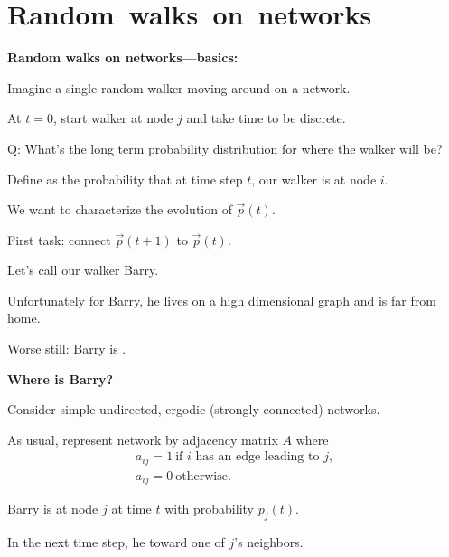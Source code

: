\section{Random\ walks\ on\ networks}

  \textbf{Random walks on networks---basics:}

  
  
    Imagine a single random walker moving
    around on a network.
   
    At $t=0$, start walker at node $j$ and 
    take time to be discrete.
   
    \alert{Q:} What's the long term probability distribution
    for where the walker will be?
   

    Define  as the probability
    that at time step $t$, our walker is at node $i$.
   
    We want to characterize the evolution
    of $\vec{p}(t)$.
   
    First task: connect $\vec{p}(t+1)$ to $\vec{p}(t)$.
   
    {Let's call our walker \alert{Barry}.}
   
    {Unfortunately for Barry,
      he lives on a high dimensional graph and is far from home.}
  
    {Worse still: Barry is .}
  


  \textbf{Where is Barry?}

  
  
    Consider simple undirected, ergodic (strongly connected) networks.
  
    As usual, represent network by \alert{adjacency matrix $A$}
    where
    $$
    \begin{array}{l}
      a_{ij}=1 \ \mbox{if $i$ has an edge leading to $j$}, \\
      a_{ij}=0 \ \mbox{otherwise.}
    \end{array}
    $$
  
    Barry is at node $j$ at time $t$ with probability $p_j(t)$.
  
    In the next time step, 
    he 
     toward one of $j$'s neighbors.
  
